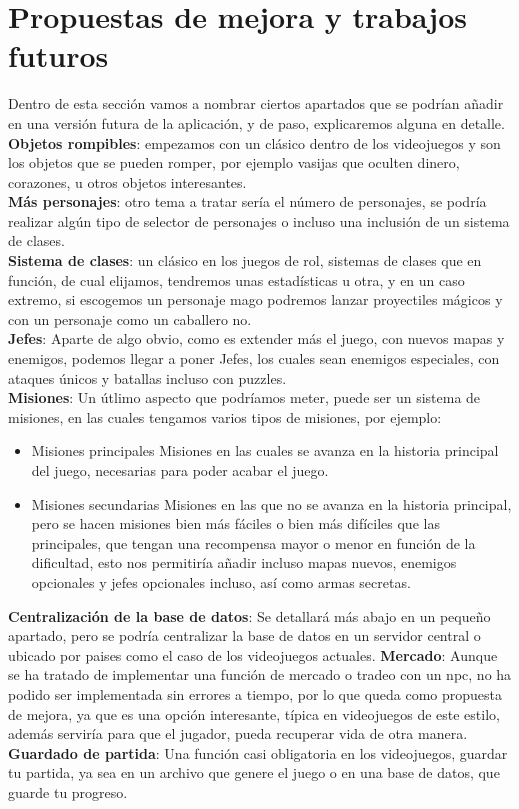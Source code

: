 \documentclass[a4paper]{article}
\begin{document}
\section{Propuestas de mejora y trabajos futuros}
Dentro de esta sección vamos a nombrar ciertos apartados que se podrían añadir en una versión futura de la aplicación, y de paso, explicaremos alguna en detalle.\\
\textbf{Objetos rompibles}: empezamos con un clásico dentro de los videojuegos y son los objetos que se pueden romper, por ejemplo vasijas que oculten dinero, corazones, u otros objetos interesantes.\\
\textbf{Más personajes}: otro tema a tratar sería el número de personajes, se podría realizar algún tipo de selector de personajes o incluso una inclusión de un sistema de clases.\\
\textbf{Sistema de clases}: un clásico en los juegos de rol, sistemas de clases que en función, de cual elijamos, tendremos unas estadísticas u otra, y en un caso extremo, si escogemos un personaje mago podremos lanzar proyectiles mágicos y con un personaje como un caballero no.\\
\textbf{Jefes}: Aparte de algo obvio, como es extender más el juego, con nuevos mapas y enemigos, podemos llegar a poner Jefes, los cuales sean enemigos especiales, con ataques únicos y batallas incluso con puzzles.\\
\textbf{Misiones}: Un útlimo aspecto que podríamos meter, puede ser un sistema de misiones, en las cuales tengamos varios tipos de misiones, por ejemplo:
\begin{itemize}
    \item Misiones principales
    Misiones en las cuales se avanza en la historia principal del juego, necesarias para poder acabar el juego.
    \item Misiones secundarias
    Misiones en las que no se avanza en la historia principal, pero se hacen misiones bien más fáciles o bien más difíciles que las principales, que tengan una recompensa mayor o menor en función de la dificultad, esto nos permitiría añadir incluso mapas nuevos, enemigos opcionales y jefes opcionales incluso, así como armas secretas.
\end{itemize}
\textbf{Centralización de la base de datos}: Se detallará más abajo en un pequeño apartado, pero se podría centralizar la base de datos en un servidor central o ubicado por paises como el caso de los videojuegos actuales.
\textbf{Mercado}: Aunque se ha tratado de implementar una función de mercado o tradeo con un npc, no ha podido ser implementada sin errores a tiempo, por lo que queda como propuesta de mejora, ya que es una opción interesante, típica en videojuegos de este estilo, además serviría para que el jugador, pueda recuperar vida de otra manera.
\textbf{Guardado de partida}: Una función casi obligatoria en los videojuegos, guardar tu partida, ya sea en un archivo que genere el juego o en una base de datos, que guarde tu progreso.
\clearpage
\end{document}
